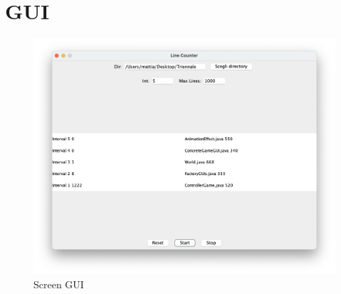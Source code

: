 \documentclass{article}
\begin{document}
\section{GUI}
\begin{figure}[h]
	\centering
	\includegraphics[width=1\linewidth]{screen-gui.png}
	\caption{Screen GUI}
	\label{fig:screen-gui}
\end{figure}
\end{document}
